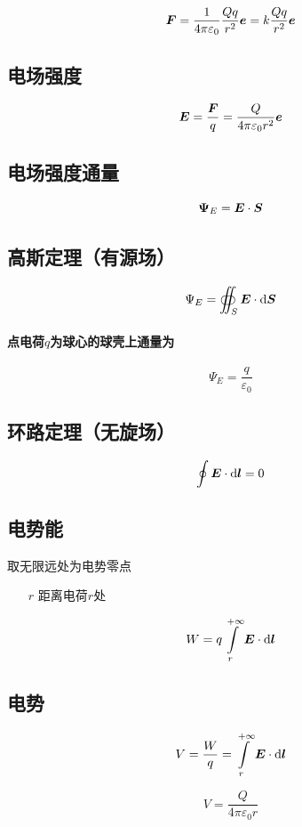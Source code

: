 \documentclass{article}
\begin{document}
\[\boldsymbol{F}=\frac1{4\pi\varepsilon_0}\frac{Qq}{r^2}\boldsymbol{e}=k\frac{Qq}{r^2}\boldsymbol{e}\]

\subsection{电场强度}

\[\boldsymbol{E}=\frac{\boldsymbol{F}}q=\frac Q{4\pi\varepsilon_0r^2}\boldsymbol{e}\]

\subsection{电场强度通量}

\[\boldsymbol{\Psi}_E=\boldsymbol{E}\cdot\boldsymbol{S}\]

\subsection{高斯定理（有源场）}

\[\Psi_E=\oiint_S\boldsymbol{E}\cdot\mathrm d\boldsymbol{S}\]

\paragraph{点电荷$q$为球心的球壳上通量为}

\[\Psi_E=\frac q{\varepsilon_0}\]

\subsection{环路定理（无旋场）}

\[\oint\boldsymbol{E}\cdot\mathrm d\boldsymbol{l}=0\]

\subsection{电势能}

取无限远处为电势零点

\begin{enumerate}
    \item[$r$] 距离电荷$r$处
\end{enumerate}

\[W=q\int\limits_r^{+\infty}\boldsymbol{E}\cdot\mathrm d\boldsymbol{l}\]

\subsection{电势}

\[V=\frac Wq=\int\limits_r^{+\infty}\boldsymbol{E}\cdot\mathrm d\boldsymbol{l}\]

\[V=\frac Q{4\pi\varepsilon_0r}\]
\end{document}
